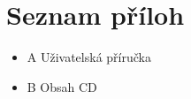 \chapter*{Seznam příloh}

\begin{itemize}
	\item A Uživatelská příručka
	\item B Obsah CD
\end{itemize}
